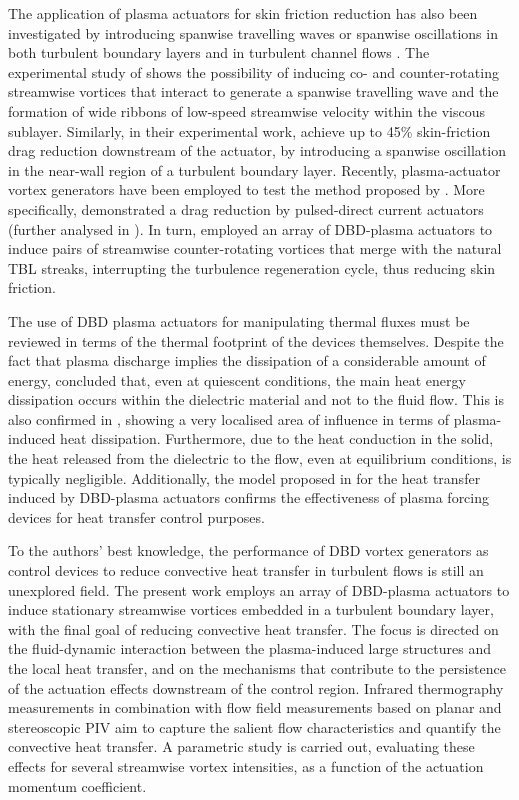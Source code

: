 The application of plasma actuators for skin friction reduction has also been investigated by introducing spanwise travelling waves or spanwise oscillations in both turbulent boundary layers \citep{Jukes2006, Hehner2019} and in turbulent channel flows \citep{Mahfoze2019}. The experimental study of \citet{Whalley2014} shows the possibility of inducing co- and counter-rotating streamwise vortices that interact to generate a spanwise travelling wave and the formation of wide ribbons of low-speed streamwise velocity within the viscous sublayer. Similarly, in their experimental work, \citet{jukes2006TBLcontrol} achieve up to 45\% skin-friction drag reduction downstream of the actuator, by introducing a spanwise oscillation in the near-wall region of a turbulent boundary layer. 
Recently, plasma-actuator vortex generators have been employed to test the method proposed by \citet{Schoppa1998}. More specifically, \citet{Corke2018,Thomas2019} demonstrated a drag reduction by pulsed-direct current actuators (further analysed in \citet{duong2021}). In turn, \citet{cheng_wong_hussain_schroder_zhou_2021} employed an array of DBD-plasma actuators to induce pairs of streamwise counter-rotating vortices that merge with the natural TBL streaks, interrupting the turbulence regeneration cycle, thus reducing skin friction.

The use of DBD plasma actuators for manipulating thermal fluxes must be reviewed in terms of the thermal footprint of the devices themselves. Despite the fact that plasma discharge implies the dissipation of a considerable amount of energy, \citet{Rodrigues2018,Rodrigues2018b} concluded that, even at quiescent conditions, the main heat energy dissipation occurs within the dielectric material and not to the fluid flow. This is also confirmed in \citet{Jukes2006}, showing a very localised area of influence in terms of plasma-induced heat dissipation. Furthermore, due to the heat conduction in the solid, the heat released from the dielectric to the flow, even at equilibrium conditions, is typically negligible. Additionally, the model proposed in \citet{Jayaraman2007} for the heat transfer induced by DBD-plasma actuators confirms the effectiveness of plasma forcing devices for heat transfer control purposes.

To the authors' best knowledge, the performance of DBD vortex generators as control devices to reduce convective heat transfer in turbulent flows is still an unexplored field.
The present work employs an array of DBD-plasma actuators to induce stationary streamwise vortices embedded in a turbulent boundary layer, with the final goal of reducing convective heat transfer. The focus is directed on the fluid-dynamic interaction between the plasma-induced large structures and the local heat transfer, and on the mechanisms that contribute to the persistence of the actuation effects downstream of the control region. Infrared thermography measurements in combination with flow field measurements based on planar and stereoscopic PIV aim to capture the salient flow characteristics and quantify the convective heat transfer. A parametric study is carried out, evaluating these effects for several streamwise vortex intensities, as a function of the actuation momentum coefficient.

